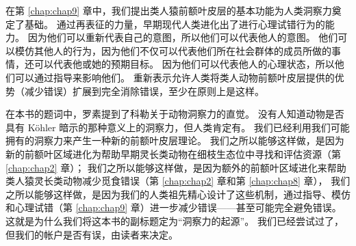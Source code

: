 在第 \ref{chap:chap9} 章中，我们提出类人猿前额叶皮层的基本功能为人类洞察力奠定了基础。
通过再表征的力量，早期现代人类进化出了进行心理试错行为的能力。
因为他们可以重新代表自己的意图，所以他们可以代表他人的意图。
他们可以模仿其他人的行为，因为他们不仅可以代表他们所在社会群体的成员所做的事情，还可以代表他或她的预期目标。
因为他们可以代表他人的心理状态，所以他们可以通过指导来影响他们。
重新表示允许人类将类人动物前额叶皮层提供的优势（减少错误）扩展到完全消除错误，至少在原则上是这样。
\par


在本书的题词中，罗素提到了科勒关于动物洞察力的直觉。
没有人知道动物是否具有 Köhler 暗示的那种意义上的洞察力，但人类肯定有。
我们已经利用我们可能拥有的洞察力来产生一种新的前额叶皮层理论。
我们之所以能够这样做，是因为新的前额叶区域进化为帮助早期灵长类动物在细枝生态位中寻找和评估资源（第 \ref{chap:chap2} 章）；
我们之所以能够这样做，是因为额外的前额叶区域进化来帮助类人猿灵长类动物减少觅食错误（第 \ref{chap:chap2} 章和第 \ref{chap:chap8} 章）， 我们之所以能够这样做，是因为我们的人类祖先精心设计了这些机制，通过指导、模仿和心理试错（第 \ref{chap:chap9} 章）进一步减少错误——甚至可能完全避免错误。
这就是为什么我们将这本书的副标题定为“洞察力的起源”。
我们已经尝试过了，但我们的帐户是否有误，由读者来决定。
